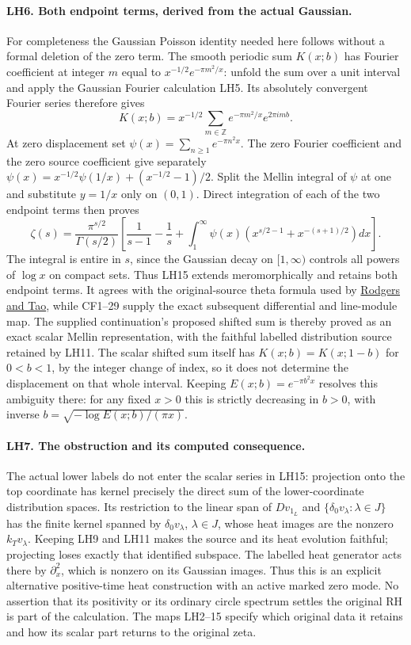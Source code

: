 \paragraph{LH6. Both endpoint terms, derived from the actual Gaussian.}
For completeness the Gaussian Poisson identity needed here follows
without a formal deletion of the zero term. The smooth periodic
sum \(K(x;b)\) has Fourier coefficient at integer \(m\) equal to
\(x^{-1/2}e^{-\pi m^2/x}\): unfold the sum over a unit interval
and apply the Gaussian Fourier calculation LH5. Its absolutely
convergent Fourier series therefore gives
\[
 K(x;b)=x^{-1/2}\sum_{m\in\mathbb Z}
                 e^{-\pi m^2/x}e^{2\pi i m b}.     \tag{LH14}
\]
At zero displacement set \(\psi(x)=\sum_{n\ge1}e^{-\pi n^2x}\).
The zero Fourier coefficient and the zero source coefficient give
separately
\(\psi(x)=x^{-1/2}\psi(1/x)+(x^{-1/2}-1)/2\).
Split the Mellin integral of \(\psi\) at one and substitute
\(y=1/x\) only on \((0,1)\). Direct integration of each of the
two endpoint terms then proves
\[
 \zeta(s)=\frac{\pi^{s/2}}{\Gamma(s/2)}
 \left[\frac1{s-1}-\frac1s+
 \int_1^\infty\psi(x)
       \left(x^{s/2-1}+x^{-(s+1)/2}\right)dx\right].             \tag{LH15}
\]
The integral is entire in \(s\), since the Gaussian decay on
\([1,\infty)\) controls all powers of \(\log x\) on compact
sets. Thus LH15 extends meromorphically and retains both endpoint
terms. It agrees with the original-source theta formula used by
\href{https://arxiv.org/abs/1801.05914v5}{Rodgers and Tao}, while
CF1--29 supply the exact subsequent differential and line-module
map. The supplied continuation's proposed shifted sum is thereby
proved as an exact scalar Mellin representation, with the faithful
labelled distribution source retained by LH11. The scalar shifted
sum itself has \(K(x;b)=K(x;1-b)\) for \(0<b<1\), by the
integer change of index, so it does not determine the displacement
on that whole interval. Keeping \(E(x;b)=e^{-\pi b^2x}\) resolves
this ambiguity there: for any fixed \(x>0\) this is strictly
decreasing in \(b>0\), with inverse
\(b=\sqrt{-\log E(x;b)/(\pi x)}\).

\paragraph{LH7. The obstruction and its computed consequence.}
The actual lower labels do not enter the scalar series in LH15:
projection onto the top coordinate has kernel precisely the direct
sum of the lower-coordinate distribution spaces. Its restriction
to the linear span of \(Dv_{1_L}\) and
\(\{\delta_0v_\lambda:\lambda\in J\}\) has the finite kernel spanned by
\(\delta_0v_\lambda\), \(\lambda\in J\), whose heat images are
the nonzero \(k_Tv_\lambda\). Keeping LH9 and LH11 makes the
source and its heat evolution faithful; projecting loses exactly
that identified subspace. The labelled heat generator acts there
by \(\partial_x^2\), which is nonzero on its Gaussian images.
Thus this is an explicit alternative positive-time heat construction
with an active marked zero mode. No assertion that its positivity
or its ordinary circle spectrum settles the original RH is part
of the calculation. The maps LH2--15 specify which original data
it retains and how its scalar part returns to the original zeta.
